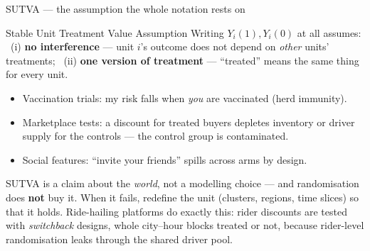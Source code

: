 \documentclass[aspectratio=169,11pt]{beamer}
\begin{document}
\begin{frame}{SUTVA --- the assumption the whole notation rests on}
  \footnotesize
  \begin{block}{Stable Unit Treatment Value Assumption}
    Writing $Y_i(1),Y_i(0)$ at all assumes: \ (i) \textbf{no interference} --- unit $i$'s
    outcome does not depend on \emph{other} units' treatments; \ (ii) \textbf{one version
    of treatment} --- ``treated'' means the same thing for every unit.
  \end{block}
  \begin{readme}
    \begin{itemize}
      \item Vaccination trials: my risk falls when \emph{you} are vaccinated (herd immunity).
      \item Marketplace tests: a discount for treated buyers depletes inventory or driver
            supply for the controls --- the control group is contaminated.
      \item Social features: ``invite your friends'' spills across arms by design.
    \end{itemize}
    SUTVA is a claim about the \emph{world}, not a modelling choice --- and randomisation
    does \textbf{not} buy it. When it fails, redefine the unit (clusters, regions,
    time slices) so that it holds. Ride-hailing platforms do exactly this: rider discounts
    are tested with \emph{switchback} designs, whole city--hour blocks treated or not,
    because rider-level randomisation leaks through the shared driver pool.
  \end{readme}
\end{frame}
\end{document}

